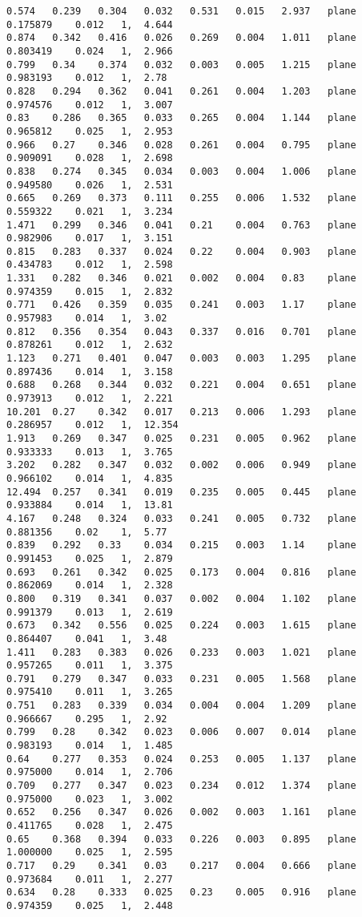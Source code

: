 {\fontsize{7.5}{10} \selectfont
	\label{code:planoAGC}
	\begin{lstlisting}[caption={Datos obtenidos para la prueba del plano usando AGC.}]
0.574	0.239	0.304	0.032	0.531	0.015	2.937	plane	0.175879	0.012	1, 	4.644
0.874	0.342	0.416	0.026	0.269	0.004	1.011	plane	0.803419	0.024	1, 	2.966
0.799	0.34	0.374	0.032	0.003	0.005	1.215	plane	0.983193	0.012	1, 	2.78
0.828	0.294	0.362	0.041	0.261	0.004	1.203	plane	0.974576	0.012	1, 	3.007
0.83	0.286	0.365	0.033	0.265	0.004	1.144	plane	0.965812	0.025	1, 	2.953
0.966	0.27	0.346	0.028	0.261	0.004	0.795	plane	0.909091	0.028	1, 	2.698
0.838	0.274	0.345	0.034	0.003	0.004	1.006	plane	0.949580	0.026	1, 	2.531
0.665	0.269	0.373	0.111	0.255	0.006	1.532	plane	0.559322	0.021	1, 	3.234
1.471	0.299	0.346	0.041	0.21	0.004	0.763	plane	0.982906	0.017	1, 	3.151
0.815	0.283	0.337	0.024	0.22	0.004	0.903	plane	0.434783	0.012	1, 	2.598
1.331	0.282	0.346	0.021	0.002	0.004	0.83	plane	0.974359	0.015	1, 	2.832
0.771	0.426	0.359	0.035	0.241	0.003	1.17	plane	0.957983	0.014	1, 	3.02
0.812	0.356	0.354	0.043	0.337	0.016	0.701	plane	0.878261	0.012	1, 	2.632
1.123	0.271	0.401	0.047	0.003	0.003	1.295	plane	0.897436	0.014	1, 	3.158
0.688	0.268	0.344	0.032	0.221	0.004	0.651	plane	0.973913	0.012	1, 	2.221
10.201	0.27	0.342	0.017	0.213	0.006	1.293	plane	0.286957	0.012	1, 	12.354
1.913	0.269	0.347	0.025	0.231	0.005	0.962	plane	0.933333	0.013	1, 	3.765
3.202	0.282	0.347	0.032	0.002	0.006	0.949	plane	0.966102	0.014	1, 	4.835
12.494	0.257	0.341	0.019	0.235	0.005	0.445	plane	0.933884	0.014	1, 	13.81
4.167	0.248	0.324	0.033	0.241	0.005	0.732	plane	0.881356	0.02	1, 	5.77
0.839	0.292	0.33	0.034	0.215	0.003	1.14	plane	0.991453	0.025	1, 	2.879
0.693	0.261	0.342	0.025	0.173	0.004	0.816	plane	0.862069	0.014	1, 	2.328
0.800	0.319	0.341	0.037	0.002	0.004	1.102	plane	0.991379	0.013	1, 	2.619
0.673	0.342	0.556	0.025	0.224	0.003	1.615	plane	0.864407	0.041	1, 	3.48
1.411	0.283	0.383	0.026	0.233	0.003	1.021	plane	0.957265	0.011	1, 	3.375
0.791	0.279	0.347	0.033	0.231	0.005	1.568	plane	0.975410	0.011	1, 	3.265
0.751	0.283	0.339	0.034	0.004	0.004	1.209	plane	0.966667	0.295	1, 	2.92
0.799	0.28	0.342	0.023	0.006	0.007	0.014	plane	0.983193	0.014	1, 	1.485
0.64	0.277	0.353	0.024	0.253	0.005	1.137	plane	0.975000	0.014	1, 	2.706
0.709	0.277	0.347	0.023	0.234	0.012	1.374	plane	0.975000	0.023	1, 	3.002
0.652	0.256	0.347	0.026	0.002	0.003	1.161	plane	0.411765	0.028	1, 	2.475
0.65	0.368	0.394	0.033	0.226	0.003	0.895	plane	1.000000	0.025	1, 	2.595
0.717	0.29	0.341	0.03	0.217	0.004	0.666	plane	0.973684	0.011	1, 	2.277
0.634	0.28	0.333	0.025	0.23	0.005	0.916	plane	0.974359	0.025	1, 	2.448

\end{lstlisting}}
